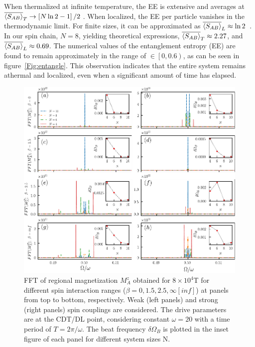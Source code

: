\documentclass[12pt]{iopart}
\begin{document}
When thermalized at infinite temperature, the EE is extensive and averages at $\displaystyle \overline{\expval{S_{AB}}}_T\rightarrow \left[N \ln{2}-1\right]/2$ \cite{Lu2021}. When localized, the EE per particle vanishes in the thermodynamic limit. For finite sizes, it can be approximated as $\overline{\expval{S_{AB}}}_L\approx \ln{2}$~\cite{sakurai_phys_nodate}. In our spin chain, $N=8$, yielding theoretical expressions, $\overline{\expval{S_{AB}}}_T\approx 2.27$, and $\overline{\expval{S_{AB}}}_L\approx 0.69$. The numerical values of the entanglement entropy (EE) are found to remain approximately in the range of $\in\left[0,0.6\right)$, as can be seen in figure~\ref{Fig:entangle}. This observation indicates that the entire system remains athermal and localized, even when a significant amount of time has elapsed.
\begin{figure}[h!]
	\begin{center}
		\includegraphics[width=12cm]{figure12.pdf}
	\end{center}
	\caption{
        FFT of regional magnetization $M^z_A$ obtained for $8\times10^4$T for different spin interaction ranges ($\beta = 0,1.5,2.5, \infty[inf]$) at panels from top to bottom, respectively. Weak (left panels) and strong (right panels) spin couplings are considered. The drive parameters are at the CDT/DL point, considering constant $\omega = 20$ with a time period of $T= 2\pi/\omega$. The beat frequency $\delta\Omega_B$ is plotted in the inset figure of each panel for different system sizes N.
        }
	\label{Fig:size_dependence}
\end{figure}		
\end{document}
